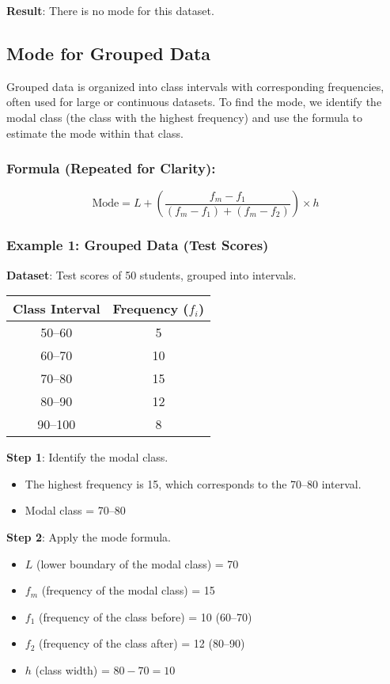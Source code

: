 \documentclass[11pt]{article}
\begin{document}
\textbf{Result}: There is no mode for this dataset.

\subsection{Mode for Grouped Data}

Grouped data is organized into class intervals with corresponding frequencies, often used for large or continuous datasets. To find the mode, we identify the modal class (the class with the highest frequency) and use the formula to estimate the mode within that class.

\subsubsection*{Formula (Repeated for Clarity):}
\[
\text{Mode} = L + \left( \frac{f_m - f_1}{(f_m - f_1) + (f_m - f_2)} \right) \times h
\]

\subsubsection*{Example 1: Grouped Data (Test Scores)}
\textbf{Dataset}: Test scores of 50 students, grouped into intervals.

\begin{center}
\begin{tabular}{|c|c|}
\hline
\textbf{Class Interval} & \textbf{Frequency} ($f_i$) \\
\hline
50--60 & 5 \\
60--70 & 10 \\
70--80 & 15 \\
80--90 & 12 \\
90--100 & 8 \\
\hline
\end{tabular}
\end{center}

\textbf{Step 1}: Identify the modal class.
\begin{itemize}
    \item The highest frequency is 15, which corresponds to the 70--80 interval.
    \item Modal class = 70--80
\end{itemize}

\textbf{Step 2}: Apply the mode formula.
\begin{itemize}
    \item $L$ (lower boundary of the modal class) = 70
    \item $f_m$ (frequency of the modal class) = 15
    \item $f_1$ (frequency of the class before) = 10 (60--70)
    \item $f_2$ (frequency of the class after) = 12 (80--90)
    \item $h$ (class width) = $80 - 70 = 10$
\end{itemize}
\end{document}
